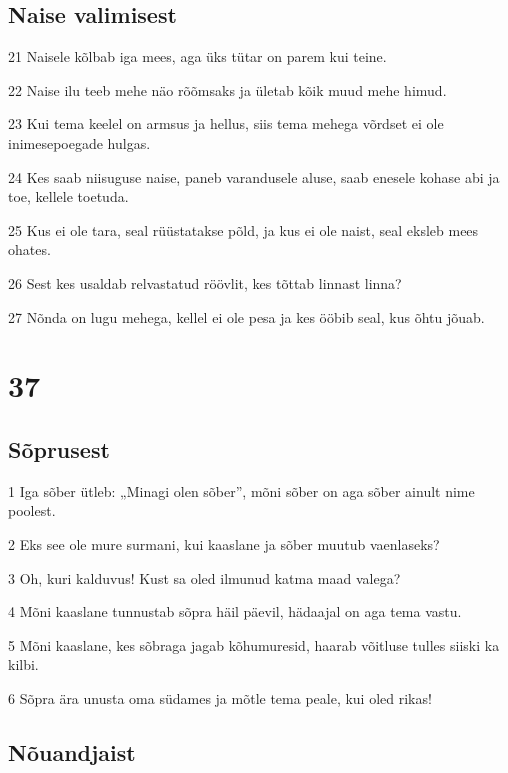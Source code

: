 \section*{Naise valimisest}

\par 21 Naisele kõlbab iga mees, aga üks tütar on parem kui teine.
\par 22 Naise ilu teeb mehe näo rõõmsaks ja ületab kõik muud mehe himud.
\par 23 Kui tema keelel on armsus ja hellus, siis tema mehega võrdset ei ole inimesepoegade hulgas.
\par 24 Kes saab niisuguse naise, paneb varandusele aluse, saab enesele kohase abi ja toe, kellele toetuda.
\par 25 Kus ei ole tara, seal rüüstatakse põld, ja kus ei ole naist, seal eksleb mees ohates.
\par 26 Sest kes usaldab relvastatud röövlit, kes tõttab linnast linna?
\par 27 Nõnda on lugu mehega, kellel ei ole pesa ja kes ööbib seal, kus õhtu jõuab.

\chapter{37}

\section*{Sõprusest}

\par 1 Iga sõber ütleb: „Minagi olen sõber”, mõni sõber on aga sõber ainult nime poolest.
\par 2 Eks see ole mure surmani, kui kaaslane ja sõber muutub vaenlaseks?
\par 3 Oh, kuri kalduvus! Kust sa oled ilmunud katma maad valega?
\par 4 Mõni kaaslane tunnustab sõpra häil päevil, hädaajal on aga tema vastu.
\par 5 Mõni kaaslane, kes sõbraga jagab kõhumuresid, haarab võitluse tulles siiski ka kilbi.
\par 6 Sõpra ära unusta oma südames ja mõtle tema peale, kui oled rikas!

\section*{Nõuandjaist}

